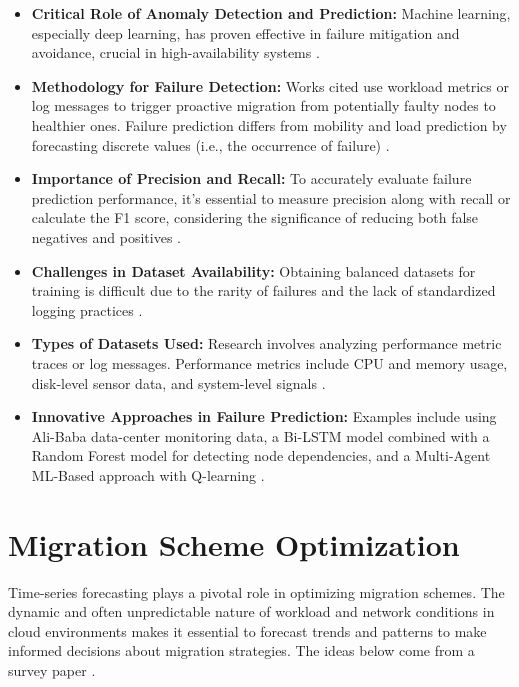 \begin{itemize}
    \item \textbf{Critical Role of Anomaly Detection and Prediction:} Machine learning, especially deep learning, has proven effective in failure mitigation and avoidance, crucial in high-availability systems \cite{Pang2021, Lin2018}.
    \item \textbf{Methodology for Failure Detection:} Works cited use workload metrics or log messages to trigger proactive migration from potentially faulty nodes to healthier ones. Failure prediction differs from mobility and load prediction by forecasting discrete values (i.e., the occurrence of failure) \cite{Li2020, Vu2021}.
    \item \textbf{Importance of Precision and Recall:} To accurately evaluate failure prediction performance, it's essential to measure precision along with recall or calculate the F1 score, considering the significance of reducing both false negatives and positives \cite{Nam2021, Das2018}.
    \item \textbf{Challenges in Dataset Availability:} Obtaining balanced datasets for training is difficult due to the rarity of failures and the lack of standardized logging practices \cite{Frank2019, Haghshenas2022}.
    \item \textbf{Types of Datasets Used:} Research involves analyzing performance metric traces or log messages. Performance metrics include CPU and memory usage, disk-level sensor data, and system-level signals \cite{Li2020, Lin2018}.
    \item \textbf{Innovative Approaches in Failure Prediction:} Examples include using Ali-Baba data-center monitoring data, a Bi-LSTM model combined with a Random Forest model for detecting node dependencies, and a Multi-Agent ML-Based approach with Q-learning \cite{Li2020, Lin2018, Haghshenas2022}.
\end{itemize}

\section{Migration Scheme Optimization}

Time-series forecasting plays a pivotal role in optimizing migration schemes. The dynamic and often unpredictable nature of workload and network conditions in cloud environments makes it essential to forecast trends and patterns to make informed decisions about migration strategies. The ideas below come from a survey paper \cite{Toumi2023}.

